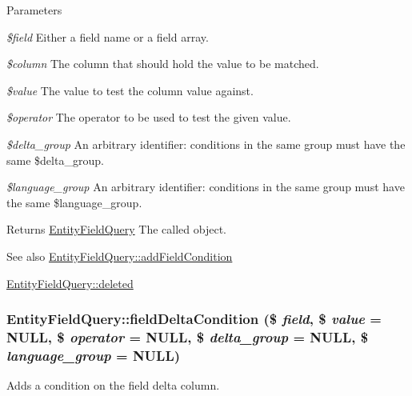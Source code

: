 \begin{DoxyParams}{Parameters}
\item[{\em \$field}]Either a field name or a field array. \item[{\em \$column}]The column that should hold the value to be matched. \item[{\em \$value}]The value to test the column value against. \item[{\em \$operator}]The operator to be used to test the given value. \item[{\em \$delta\_\-group}]An arbitrary identifier: conditions in the same group must have the same \$delta\_\-group. \item[{\em \$language\_\-group}]An arbitrary identifier: conditions in the same group must have the same \$language\_\-group.\end{DoxyParams}
\begin{DoxyReturn}{Returns}
\hyperlink{classEntityFieldQuery}{EntityFieldQuery} The called object.
\end{DoxyReturn}
\begin{DoxySeeAlso}{See also}
\hyperlink{classEntityFieldQuery_addc28605e17a54c0198f3cd6e2753489}{EntityFieldQuery::addFieldCondition} 

\hyperlink{classEntityFieldQuery_a49543cc7ea0841ba46d4ebe310695ce3}{EntityFieldQuery::deleted} 
\end{DoxySeeAlso}
\hypertarget{classEntityFieldQuery_a2008e72f472747354332f0b42971032f}{
\subsubsection[{fieldDeltaCondition}]{\setlength{\rightskip}{0pt plus 5cm}EntityFieldQuery::fieldDeltaCondition (\$ {\em field}, \/  \$ {\em value} = {\ttfamily NULL}, \/  \$ {\em operator} = {\ttfamily NULL}, \/  \$ {\em delta\_\-group} = {\ttfamily NULL}, \/  \$ {\em language\_\-group} = {\ttfamily NULL})}}
\label{classEntityFieldQuery_a2008e72f472747354332f0b42971032f}
Adds a condition on the field delta column.



